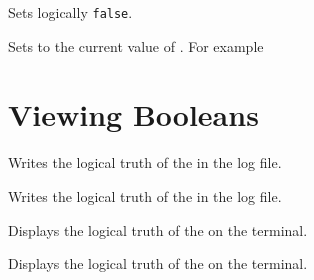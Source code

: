 \documentclass[oneside]{book}
\begin{document}
\begin{function}{\BoolSetFalse}
\begin{syntax}
 
\end{syntax}
Sets  logically \texttt{false}.
\end{function}

\begin{function}{\BoolSetEq}
\begin{syntax}
  
\end{syntax}
Sets  to the current value of .
For example
\begin{codehigh}
\BoolSetTrue \lTmpaBool
\BoolSetEq \lTmpbBool \lTmpaBool
\BoolVarLog \lTmpbBool
\end{codehigh}
\end{function}

\section{Viewing Booleans}

\begin{function}{\BoolLog}
\begin{syntax}
 
\end{syntax}
Writes the logical truth of the  in the log file.
\end{function}

\begin{function}{\BoolVarLog}
\begin{syntax}
 
\end{syntax}
Writes the logical truth of the  in the log file.
\end{function}

\begin{function}{\BoolShow}
\begin{syntax}
 
\end{syntax}
Displays the logical truth of the  on the terminal.
\end{function}

\begin{function}{\BoolVarShow}
\begin{syntax}
 
\end{syntax}
Displays the logical truth of the  on the terminal.
\end{function}
\end{document}
